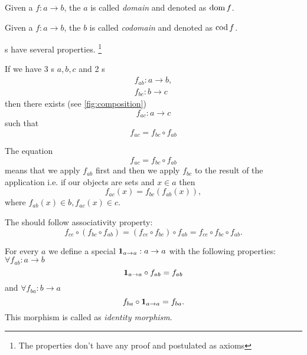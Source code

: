 \begin{definition}[Domain]
  \label{def:domain}
  Given a  $f: a \to b$, the
   $a$ is called \textit{domain} and denoted as $\operatorname{dom} f$.
\end{definition}

\begin{definition}[Codomain]
  \label{def:codomain}
  Given a  $f: a \to b$, the
   $b$ is called \textit{codomain} and denoted as $\operatorname{cod} f$.
\end{definition}

s have several properties. \footnote{The
  properties don't have any proof and postulated as axioms}
\begin{axiom}[Composition]
  \label{axm:composition}
  If we have 3 s $a, b, c$ and 2
  s 
  \begin{eqnarray}
  f_{ab} : a \rightarrow b,
  \nonumber \\
  f_{bc} : b \rightarrow c
  \nonumber 
  \end{eqnarray}
  then there exists  (see \cref{fig:composition})
  \[
  f_{ac} : a \rightarrow c
  \]
  such that
  \[
  f_{ac} = f_{bc} \circ f_{ab}
  \]
\end{axiom}

\begin{remark}[Composition]
  \label{rem:composition}
  The equation
  \[
  f_{ac} = f_{bc} \circ f_{ab}
  \]
  means that we apply $f_{ab}$ first and then we apply $f_{bc}$ to the
  result of the application i.e. if our objects are sets and $x \in a$
  then 
  \[
  f_{ac} ( x ) = f_{bc} ( f_{ab} ( x ) ),
  \]
  where $f_{ab} ( x ) \in b, f_{ac} ( x ) \in c$.
\end{remark}

\begin{axiom}[Associativity]
  \label{axm:associativity}
  The   should
  follow associativity property:
  \[
  f_{ce} \circ (f_{bc} \circ f_{ab}) = (f_{ce} \circ f_{bc}) \circ
  f_{ab} = f_{ce} \circ f_{bc} \circ f_{ab}.
  \]
\end{axiom}

\begin{definition}
  \label{def:id}
  For every  $a$ we define a special
   $\mathbf{1}_{ a \to a } : a \rightarrow a$ with the
  following properties: $\forall f_{ab} : a \rightarrow b$
  \begin{equation}
    \mathbf{1}_{ a \to a } \circ f_{ab} = f_{ab}
    \label{eq:leftid}
  \end{equation}
  and
  $\forall f_{ba} : b \rightarrow a$
  \begin{equation}
    f_{ba} \circ \mathbf{1}_{ a \to a }  = f_{ba}.
    \label{eq:rightid}
  \end{equation}
  This morphism is called as \textit{identity morphism}.
\end{definition}


